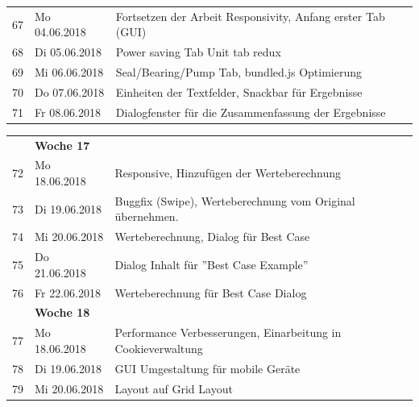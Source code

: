 \documentclass{article}
\begin{document}
{\begin{tabular}{l|p{2.5cm}|p{15cm}}
			
			
			67 & Mo 04.06.2018	  & 
			Fortsetzen der Arbeit Responsivity, Anfang erster Tab (GUI)\\

			68 & Di 05.06.2018	  & 
			Power saving Tab Unit tab redux\\

			69 & Mi 06.06.2018			 & 
			Seal/Bearing/Pump Tab, bundled.js Optimierung\\

			70 & Do 07.06.2018  & 
			Einheiten der Textfelder, Snackbar für Ergebnisse\\

			71 & Fr 08.06.2018 & 
			Dialogfenster für die  Zusammenfassung der Ergebnisse\\
			
			
	\end{tabular}
	\begin{tabular}{l|p{2.5cm}|p{15cm}}



			& \textbf{Woche 17}&\\

			
			
			72 & Mo 18.06.2018	  & 
			Responsive, Hinzufügen der Werteberechnung\\

			73 & Di 19.06.2018	  & 
			Buggfix (Swipe), Werteberechnung vom Original übernehmen.\\

			74 & Mi 20.06.2018			 & 
			Werteberechnung, Dialog für Best Case	\\

			75 & Do 21.06.2018  & 
			Dialog Inhalt für ''Best Case Example''\\

			76 & Fr 22.06.2018 & 
			Werteberechnung für Best Case Dialog\\

			

			& \textbf{Woche 18}&\\
		
			
			77 & Mo 18.06.2018	  & 
			Performance Verbesserungen, Einarbeitung in Cookieverwaltung\\

			78 & Di 19.06.2018	  & 
			GUI Umgestaltung für mobile Geräte\\

			79 & Mi 20.06.2018			 & 
			Layout auf Grid Layout\\


\end{tabular}}
\end{document}
